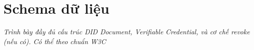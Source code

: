 \chapter{Schema dữ liệu}
\textit{Trình bày đầy đủ cấu trúc DID Document, Verifiable Credential, và cơ chế revoke (nếu có). Có thể theo chuẩn W3C}